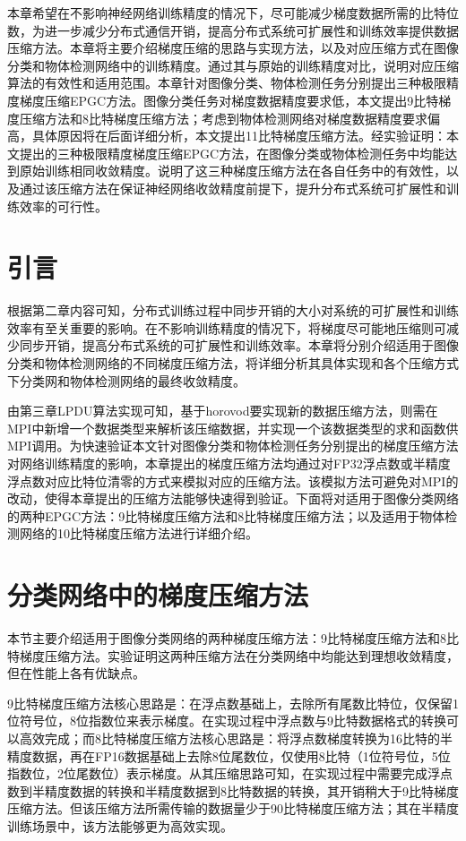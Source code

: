 本章希望在不影响神经网络训练精度的情况下，尽可能减少梯度数据所需的比特位数，为进一步减少分布式通信开销，提高分布式系统可扩展性和训练效率提供数据压缩方法。本章将主要介绍梯度压缩的思路与实现方法，以及对应压缩方式在图像分类和物体检测网络中的训练精度。通过其与原始的训练精度对比，说明对应压缩算法的有效性和适用范围。本章针对图像分类、物体检测任务分别提出三种极限精度梯度压缩EPGC方法。图像分类任务对梯度数据精度要求低，本文提出9比特梯度压缩方法和8比特梯度压缩方法；考虑到物体检测网络对梯度数据精度要求偏高，具体原因将在后面详细分析，本文提出11比特梯度压缩方法。经实验证明：本文提出的三种极限精度梯度压缩EPGC方法，在图像分类或物体检测任务中均能达到原始训练相同收敛精度。说明了这三种梯度压缩方法在各自任务中的有效性，以及通过该压缩方法在保证神经网络收敛精度前提下，提升分布式系统可扩展性和训练效率的可行性。
\section{引言}
根据第二章内容可知，分布式训练过程中同步开销的大小对系统的可扩展性和训练效率有至关重要的影响。在不影响训练精度的情况下，将梯度尽可能地压缩则可减少同步开销，提高分布式系统的可扩展性和训练效率。本章将分别介绍适用于图像分类和物体检测网络的不同梯度压缩方法，将详细分析其具体实现和各个压缩方式下分类网和物体检测网络的最终收敛精度。

由第三章LPDU算法实现可知，基于horovod要实现新的数据压缩方法，则需在MPI中新增一个数据类型来解析该压缩数据，并实现一个该数据类型的求和函数供MPI调用。为快速验证本文针对图像分类和物体检测任务分别提出的梯度压缩方法对网络训练精度的影响，本章提出的梯度压缩方法均通过对FP32浮点数或半精度浮点数对应比特位清零的方式来模拟对应的压缩方法。该模拟方法可避免对MPI的改动，使得本章提出的压缩方法能够快速得到验证。下面将对适用于图像分类网络的两种EPGC方法：9比特梯度压缩方法和8比特梯度压缩方法；以及适用于物体检测网络的10比特梯度压缩方法进行详细介绍。
\section{分类网络中的梯度压缩方法}
本节主要介绍适用于图像分类网络的两种梯度压缩方法：9比特梯度压缩方法和8比特梯度压缩方法。实验证明这两种压缩方法在分类网络中均能达到理想收敛精度，但在性能上各有优缺点。

9比特梯度压缩方法核心思路是：在浮点数基础上，去除所有尾数比特位，仅保留1位符号位，8位指数位来表示梯度。在实现过程中浮点数与9比特数据格式的转换可以高效完成；而8比特梯度压缩方法核心思路是：将浮点数梯度转换为16比特的半精度数据，再在FP16数据基础上去除8位尾数位，仅使用8比特（1位符号位，5位指数位，2位尾数位）表示梯度。从其压缩思路可知，在实现过程中需要完成浮点数到半精度数据的转换和半精度数据到8比特数据的转换，其开销稍大于9比特梯度压缩方法。但该压缩方法所需传输的数据量少于90比特梯度压缩方法；其在半精度训练场景中，该方法能够更为高效实现。
